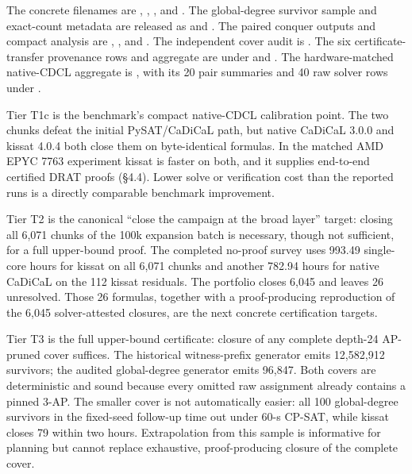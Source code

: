 {\sloppy The concrete filenames are ,
,
, and
. The global-degree
survivor sample and exact-count metadata are released as
 and
. The paired
conquer outputs and compact analysis are
,
, and
. The independent
cover audit is .
The six certificate-transfer provenance rows and aggregate are under
 and
.
The hardware-matched native-CDCL aggregate is
, with its 20 pair summaries
and 40 raw solver rows under .\par}

Tier T1c is the benchmark's compact native-CDCL calibration point. The two
chunks defeat the initial PySAT/CaDiCaL path, but native CaDiCaL 3.0.0 and
kissat 4.0.4 both close them on byte-identical formulas. In the matched
AMD EPYC 7763 experiment kissat is faster on both, and it supplies end-to-end
certified DRAT proofs (§4.4). Lower solve or
verification cost than the reported runs is a directly comparable benchmark
improvement.

Tier T2 is the canonical ``close the campaign at the broad layer'' target:
closing all 6,071 chunks of the 100k expansion batch is necessary, though
not sufficient, for a full upper-bound proof. The completed no-proof survey
uses 993.49 single-core hours for kissat on all 6,071 chunks and another
782.94 hours for native CaDiCaL on the 112 kissat residuals. The portfolio
closes 6,045 and leaves 26 unresolved. Those 26 formulas, together with a
proof-producing reproduction of the 6,045 solver-attested closures, are the
next concrete certification targets.

Tier T3 is the full upper-bound certificate: closure of any complete
depth-24 AP-pruned cover suffices. The historical witness-prefix generator
emits 12,582,912 survivors; the audited global-degree generator emits 96,847.
Both covers are deterministic and sound because every omitted raw assignment
already contains a pinned 3-AP. The smaller cover is not automatically easier:
all 100 global-degree survivors in the fixed-seed follow-up time out under
60-s CP-SAT, while kissat closes 79 within two hours. Extrapolation from this
sample is informative for planning but cannot replace exhaustive,
proof-producing closure of the complete cover.

